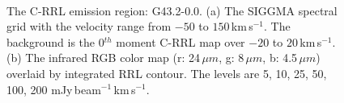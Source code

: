 \documentclass[manuscript]{aastex61}
\newcommand{\kms}{\,km\,s$^{-1}$}
\newcommand{\um}{\mu m}
\begin{document}
\begin{figure}[H]
	\centering
	\\ 
	\caption{The C-RRL emission region: G43.2-0.0.
	(a) The SIGGMA spectral grid with the velocity range from $-50$ to $150$\kms.
	The background is the 0$^{th}$ moment C-RRL map over $-20$ to $20$\kms.
	(b) The infrared RGB color map (r: 24\,$\um$, g: 8\,$\um$, b: 4.5\,$\um$) overlaid by integrated RRL contour.
	The levels are 5, 10, 25, 50, 100, 200 mJy\,beam$^{-1}$\kms.}
	\label{fig_crrl-g432}
\end{figure}
\end{document}
